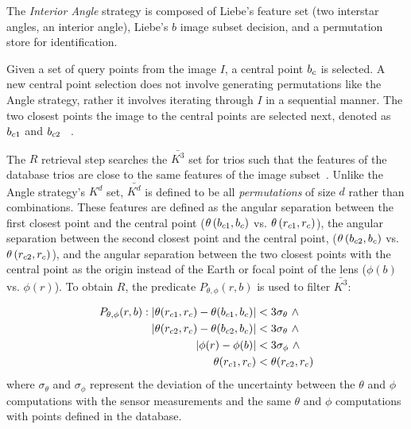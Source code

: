 The \textit{Interior Angle} strategy is composed of Liebe's feature set (two interstar angles, an interior angle),
Liebe's $b$ image subset decision, and a permutation store for identification.

Given a set of query points from the image $I$, a central point $b_c$ is selected.
A new central point selection does not involve generating permutations like the Angle strategy, rather it involves
iterating through $I$ in a sequential manner.
The two closest points the image to the central points are selected next, denoted as $b_{c1}$ and $b_{c2}$
~\cite{liebe:starTrackersAttitudeDetermination}.

The $R$ retrieval step searches the $\bar{K^3}$ set for trios such that the features of the database trios are
close to the same features of the image subset~\cite{bratt:analysisStarIdentification}.
Unlike the Angle strategy's $K^d$ set, $\bar{K^d}$ is defined to be all \textit{permutations} of size $d$ rather than
combinations.
These features are defined as the angular separation between the first closest point and the central point
($\theta\left(b_{c1}, b_c\right)$ vs. $ \theta\left(r_{c1}, r_c\right)$), the
angular separation between the second closest point and the central point, ($\theta\left(b_{c2},
b_c\right) $ vs. $\theta\left(r_{c2}, r_c\right)$),
and the angular separation between the two closest points with the central point as the origin instead of the Earth or
focal point of the lens ($\phi(b) $ vs. $ \phi(r)$).
To obtain $R$, the predicate $P_{\theta, \phi}(r, b)$ is used to filter $\bar{K^3}$:

\begin{equation}
    \begin{aligned}
        P_{\theta, \phi} (r, b): \left\lvert \theta(r_{c1}, r_c) - \theta(b_{c1}, b_c)\right\rvert
        &< 3 \sigma_{\theta} \ \land \\ \left\lvert \theta(r_{c2}, r_c) - \theta(b_{c2}, 
        b_c)\right\rvert &< 3 \sigma_{\theta} \ \land \\ \left\lvert \phi(r) - \phi(b)\right\rvert &< 3 
        \sigma_\phi \ \land \\\theta(r_{c1}, r_c) &< \theta(r_{c2}, r_c)
    \end{aligned}
\end{equation}
where $\sigma_{\theta}$ and $\sigma_{\phi}$ represent the deviation of the uncertainty between the $\theta$ and $\phi$
computations with the sensor measurements and the same $\theta$ and $\phi$ computations with points defined in the
database.

